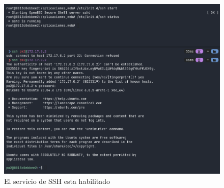 \begin{figure}[H]
  \centering
  \includegraphics[width=1.0\textwidth]{img/ssh.png}
  \caption{El servicio de SSH esta habilitado}
\end{figure}


